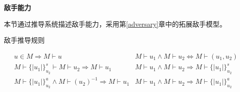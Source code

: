 \textbf{敌手能力}

本节通过推导系统描述敌手能力，采用第\ref{adversary}章中的拓展敌手模型。



\begin{table}[htb]
  \centering
  \caption{敌手推导规则}
\[\begin{matrix}

   u\in M\Rightarrow M\vdash u & M\vdash {{u}_{1}}\wedge M\vdash {{u}_{2}}\Leftrightarrow M\vdash ({{u}_{1}},{{u}_{2}})  \\
   M\vdash \{|{{u}_{1}}|\}_{{{u}_{2}}}^{s}\vdash M\vdash {{u}_{2}}\Rightarrow M\vdash {{u}_{1}} & M\vdash {{u}_{1}}\wedge M\vdash {{u}_{2}}\Rightarrow M\vdash \{|{{u}_{1}}|\}_{{{u}_{2}}}^{s}  \\
   M\vdash \{|{{u}_{1}}|\}_{{{u}_{2}}}^{a}\wedge M\vdash {{({{u}_{2}})}^{-1}}\Rightarrow M\vdash {{u}_{1}} & M\vdash {{u}_{1}}\wedge M\vdash {{u}_{2}}\Rightarrow M\vdash \{|{{u}_{1}}|\}_{{{u}_{2}}}^{a}  \\


\end{matrix}\] 

\label{table:chap02-inference}
\end{table}
